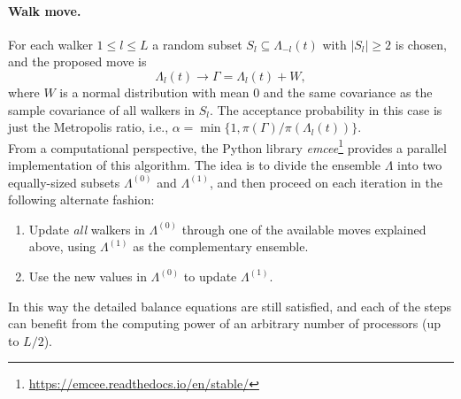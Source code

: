   \paragraph{Walk move.} For each walker \(1\leq l \leq L\) a random subset \(S_l \subseteq \Lambda_{-l}(t)\) with \(|S_l| \geq 2\) is chosen, and the proposed move is
\[
\Lambda_l(t) \to \Gamma = \Lambda_l(t) + W,
\]
where \(W\) is a normal distribution with mean \(0\) and the same covariance as the sample covariance of all walkers in \(S_l\). The acceptance probability in this case is just the Metropolis ratio, i.e., \(\alpha=\min\{1, \pi(\Gamma)/\pi(\Lambda_l(t))\}\).\\

From a computational perspective, the Python library \textit{emcee}\footnote{\url{https://emcee.readthedocs.io/en/stable/}} \citep{foreman2013emcee} provides a parallel implementation of this algorithm. The idea is to divide the ensemble \(\Lambda\) into two equally-sized subsets \(\Lambda^{(0)}\) and \(\Lambda^{(1)}\), and then proceed on each iteration in the following alternate fashion:

\begin{enumerate}[1.]
  \item Update \textit{all} walkers in \(\Lambda^{(0)}\) through one of the available moves explained above, using \(\Lambda^{(1)}\) as the complementary ensemble.
  \item Use the new values in \(\Lambda^{(0)}\) to update \(\Lambda^{(1)}\).
\end{enumerate}

In this way the detailed balance equations are still satisfied, and each of the steps can benefit from the computing power of an arbitrary number of processors (up to \(L/2\)).
